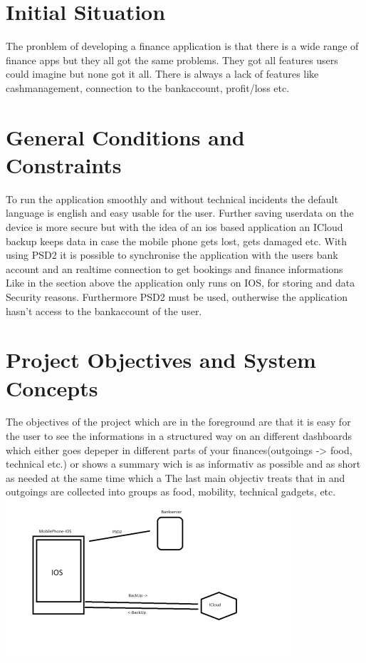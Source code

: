 \documentclass[12pt]{article}
\theoremstyle{definition}
\begin{document}
\section{Initial Situation}

The pronblem of developing a finance application is that there is a wide range of finance apps but they all got the same problems.
They got all features users could imagine but none got it all.
There is always a lack of features like cashmanagement, connection to the bankaccount, profit/loss etc.

\pagebreak

\section{General Conditions and Constraints}

To run the application smoothly and without technical incidents
the default language is english and easy usable for the user.
Further saving userdata on the device is more secure but with the idea of an ios based application an ICloud backup keeps data in case the mobile phone gets lost, gets damaged etc.
With using PSD2 it is possible to synchronise the application with the users bank account and an realtime connection to get bookings and finance informations
\\

Like in the section above the application only runs on IOS, for storing and data Security reasons. Furthermore PSD2 must be used, outherwise the application hasn't access to the bankaccount of the user.
\pagebreak

\section{Project Objectives and System Concepts}

The objectives of the project which are in the foreground are that 
it is easy for the user to see the informations in a structured way on an different dashboards which either goes depeper in different parts of your finances(outgoings -> food, technical etc.) or 
shows a summary wich is as informativ as possible and as short as needed at the same time which a
The last main objectiv treats that in and outgoings are collected into groups as food, mobility, technical gadgets, etc. 
\\
\includegraphics[scale=1.2]{Organisation.png}
\end{document}
